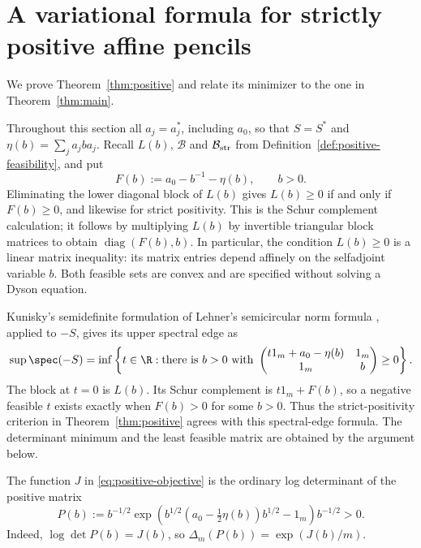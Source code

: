 \section{A variational formula for strictly positive affine pencils}\label{sec:positive}


We prove Theorem~\ref{thm:positive} and relate its minimizer to the one in Theorem~\ref{thm:main}.

Throughout this section all $a_j=a_j^*$, including $a_0$, so that $S=S^*$ and $\eta(b)=\sum_j a_jba_j$.
Recall $L(b)$, $\mathcal B$ and $\mathcal B_{\rm str}$ from Definition~\ref{def:positive-feasibility}, and put
\begin{equation}\label{eq:residual}
 F(b):=a_0-b^{-1}-\eta(b),\qquad b>0.
\end{equation}
Eliminating the lower diagonal block of $L(b)$ gives $L(b)\ge0$ if and only if $F(b)\ge0$, and likewise for strict positivity.
This is the Schur complement calculation; it follows by multiplying $L(b)$ by invertible triangular block matrices to obtain $\operatorname{diag}(F(b),b)$.
In particular, the condition $L(b)\ge0$ is a linear matrix inequality: its matrix entries depend affinely on the selfadjoint variable $b$.
Both feasible sets are convex and are specified without solving a Dyson equation.

\begin{remark}
\label{rem:positive-sdp}
Kunisky's semidefinite formulation of Lehner's semicircular norm formula \cite[Theorem 1.9 and Section 4.1]{Kun26}, applied to $-S$, gives its upper spectral edge as
\[
 \sup\spec(-S)=\inf\left\{t\in\R:
   \text{there is }b>0\text{ with }
   \begin{pmatrix}t1_m+a_0-\eta(b)&1_m\\1_m&b\end{pmatrix}\ge0
                         \right\}.
\]
The block at $t=0$ is $L(b)$.
Its Schur complement is $t1_m+F(b)$, so a negative feasible $t$ exists exactly when $F(b)>0$ for some $b>0$.
Thus the strict-positivity criterion in Theorem~\ref{thm:positive} agrees with this spectral-edge formula.
The determinant minimum and the least feasible matrix are obtained by the argument below.
\end{remark}

The function $J$ in \eqref{eq:positive-objective} is the ordinary log determinant of the positive matrix
\begin{equation}\label{eq:positive-trial-matrix}
 P(b):=b^{-1/2}\exp\left(
 b^{1/2}(a_0-\tfrac12\eta(b))b^{1/2}-1_m\right)b^{-1/2}>0.
\end{equation}
Indeed, $\log\det P(b)=J(b)$, so $\Delta_m(P(b))=\exp(J(b)/m)$.


